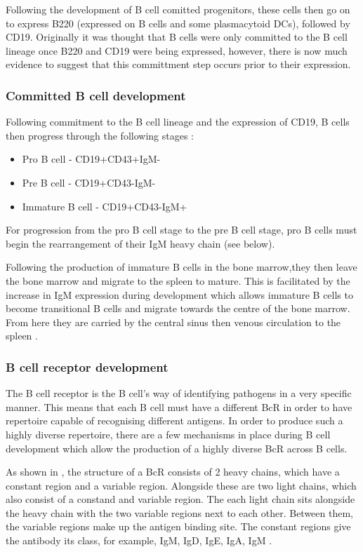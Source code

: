 Following the development of B cell comitted progenitors, these cells then go on to express B220 (expressed on B cells and some plasmacytoid DCs), followed by CD19.
Originally it was thought that B cells were only committed to the B cell lineage once B220 and CD19 were being expressed, however, there is now much evidence to suggest that this committment step occurs prior to their expression.


\subsubsection{Committed B cell development}

Following commitment to the B cell lineage and the expression of CD19, B cells then progress through the following stages \citep{Cambier2007}:
\begin{itemize}
\item Pro B cell - CD19+CD43+IgM-
\item Pre B cell - CD19+CD43-IgM-
\item Immature B cell - CD19+CD43-IgM+
\end{itemize}

For progression from the pro B cell stage to the pre B cell stage, pro B cells must begin the rearrangement of their IgM heavy chain (see below).

Following the production of immature B cells in the bone marrow,they then leave the bone marrow and migrate to the spleen to mature.
This is facilitated by the increase in IgM expression during development which allows immature B cells to become transitional B cells and migrate towards the centre of the bone marrow. 
From here they are carried by the central sinus then venous circulation to the spleen \citep{Loder1999}.


\subsubsection{B cell receptor development}
\label{subsubsec:Bcellrecepdevelopment}

The B cell receptor is the B cell's way of identifying pathogens in a very specific manner.
This means that each B cell must have a different BcR in order to have repertoire capable of recognising different antigens.
In order to produce such a highly diverse repertoire, there are a few mechanisms in place during B cell development which allow the production of a highly diverse BcR across B cells.

As shown in , the structure of a BcR consists of 2 heavy chains, which have a constant region and a variable region.
Alongside these are two light chains, which also consist of a constand and variable region.
The each light chain sits alongside the heavy chain with the two variable regions next to each other.
Between them, the variable regions make up the antigen binding site.
The constant regions give the antibody its class, for example, IgM, IgD, IgE, IgA, IgM \citep{Pieper2013}.

